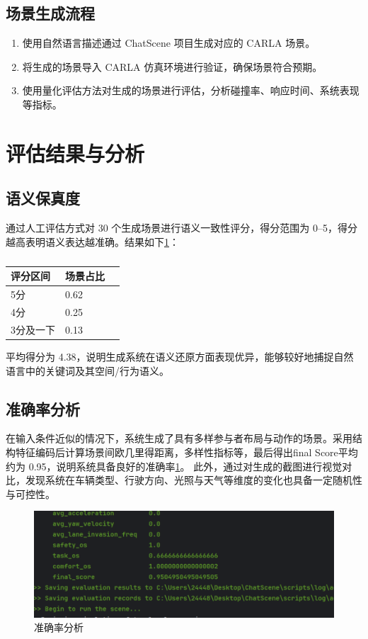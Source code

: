 \vspace{10pt} %

\subsection*{场景生成流程}
\begin{enumerate}[leftmargin=20pt]
	\item 使用自然语言描述通过 ChatScene 项目生成对应的 CARLA 场景。
	\item 将生成的场景导入 CARLA 仿真环境进行验证，确保场景符合预期。
	\item 使用量化评估方法对生成的场景进行评估，分析碰撞率、响应时间、系统表现等指标。
\end{enumerate}
	

\section{评估结果与分析}

\subsection{语义保真度}
通过人工评估方式对 30 个生成场景进行语义一致性评分，得分范围为 0–5，得分越高表明语义表达越准确。结果如下\ref{tab:dependencies}：
	\begin{table}[htbp]
	\centering
	\begin{tabular}{lll}
		\hline
		\textbf{评分区间} & \textbf{场景占比} \\
		\hline
		5分 & 0.62 \\
		4分 & 0.25 \\
		3分及一下 & 0.13 \\
		\hline
	\end{tabular}
	\caption{}
	\label{tab:dependencies}
\end{table}


平均得分为 4.38，说明生成系统在语义还原方面表现优异，能够较好地捕捉自然语言中的关键词及其空间/行为语义。

\subsection{准确率分析}
在输入条件近似的情况下，系统生成了具有多样参与者布局与动作的场景。采用结构特征编码后计算场景间欧几里得距离，多样性指标等，最后得出final Score平均约为 0.95，说明系统具备良好的准确率\ref{fig:accuracy_analysis}。
此外，通过对生成的截图进行视觉对比，发现系统在车辆类型、行驶方向、光照与天气等维度的变化也具备一定随机性与可控性。
\begin{figure}[h]
	\centering
	\includegraphics[width=1.0\textwidth]{"images/result2.pdf"}
	\caption{准确率分析}
	\label{fig:accuracy_analysis}
\end{figure}

